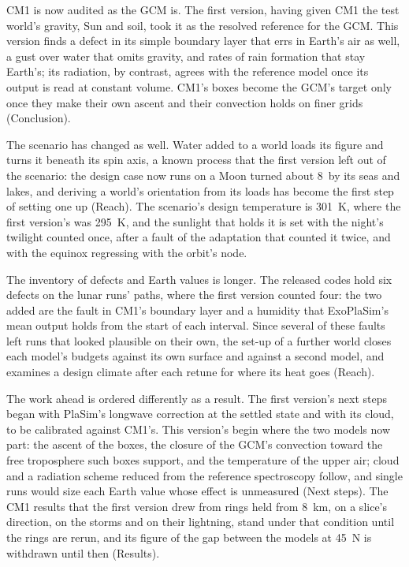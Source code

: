 CM1 is now audited as the GCM is. The first version, having given CM1 the test world's gravity, Sun and soil, took
it as the resolved reference for the GCM. This version finds a defect in its simple boundary layer that errs in
Earth's air as well, a gust over water that omits gravity, and rates of rain formation that stay
Earth's; its radiation, by contrast, agrees with the reference model once its
output is read at constant volume. CM1's boxes become the GCM's target only once they make their own
ascent and their convection holds on finer grids (Conclusion).

The scenario has changed as well. Water added to a world loads its figure and turns it beneath its spin axis, a
known process that the first version left out of the scenario: the design case now runs on a Moon turned about
8\textdegree\ by its seas and lakes, and deriving a world's orientation from its loads has become the first step of
setting one up (Reach). The scenario's design temperature is 301~K, where the first version's
was 295~K, and the sunlight that holds it is set with the night's twilight counted once, after a fault of the
adaptation that counted it twice, and with the equinox regressing with the orbit's node.

The inventory of defects and Earth values is longer. The released codes hold six defects on the lunar runs' paths,
where the first version counted four: the two added are the fault in CM1's boundary layer and a humidity that
ExoPlaSim's mean output holds from the start of each interval. Since several of these faults
left runs that looked plausible on their own, the set-up of a further world closes each model's budgets against its
own surface and against a second model, and examines a design climate after each retune for where its heat goes
(Reach).

The work ahead is ordered differently as a result. The first version's next steps began with PlaSim's longwave
correction at the settled state and with its cloud, to be calibrated against CM1's. This version's begin where the
two models now part: the ascent of the boxes, the closure of the GCM's convection toward the free troposphere such
boxes support, and the temperature of the upper air; cloud and a radiation scheme reduced from the reference
spectroscopy follow, and single runs would size each Earth value whose effect is unmeasured (Next
steps). The CM1 results that the first version drew from rings held from 8~km, on a slice's
direction, on the storms and on their lightning, stand under that condition until the rings are rerun, and its
figure of the gap between the models at 45\textdegree~N is withdrawn until then (Results).
